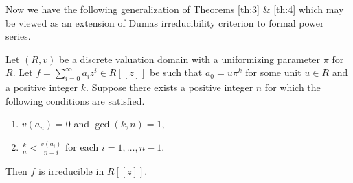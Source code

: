\documentclass[12pt,reqno]{amsart}%
\begin{document}
Now we have the following generalization of Theorems \ref{th:3} \& \ref{th:4} which may be viewed as an extension of Dumas irreducibility criterion \cite{D} to formal power series.
\begin{theorem}\label{th:6}
Let $(R,v)$ be a discrete valuation domain with a uniformizing parameter $\pi$ for $R$. Let $f=\sum_{i=0}^\infty a_iz^i\in R[[z]]$ be such that $a_0=u\pi^k$ for some unit $u\in R$ and a positive integer $k$. Suppose there exists  a positive integer $n$ for which the following conditions are satisfied.
\begin{enumerate}
\item[(i)] $v(a_n)=0$ and $\gcd(k,n)=1$,
\item[(ii)] $\frac{k}{n}<\frac{v(a_i)}{n-i}$ for each $i=1,\ldots,n-1$.
\end{enumerate}
Then  $f$ is irreducible in $R[[z]]$.
\end{theorem}
\end{document}
